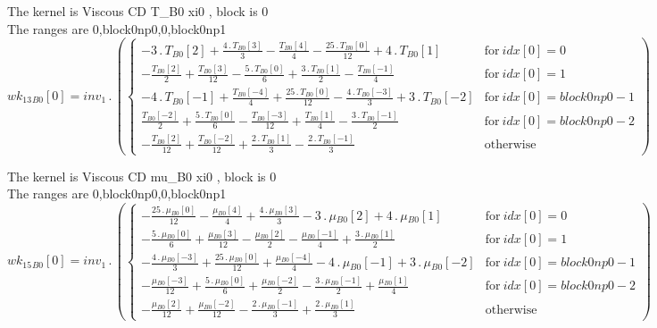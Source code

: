 \documentclass{article}
\begin{document}
\noindent The kernel is Viscous CD T_B0 xi0 , block is 0\\\noindent The ranges are 0,block0np0,0,block0np1\\\begin{dmath}{wk_{13}{_{B0}}}[{0}] = inv_1 \,.\, \left(\begin{cases} - 3 \,.\, {T{_{B0}}}[{2}] + \frac{4 \,.\, {T{_{B0}}}[{3}]}{3} - \frac{{T{_{B0}}}[{4}]}{4} - \frac{25 \,.\, {T{_{B0}}}[{0}]}{12} + 4 \,.\, {T{_{B0}}}[{1}] & \text{for}\: {idx}[{0}] = 
0 \\- \frac{{T{_{B0}}}[{2}]}{2} + \frac{{T{_{B0}}}[{3}]}{12} - \frac{5 \,.\, {T{_{B0}}}[{0}]}{6} + \frac{3 \,.\, {T{_{B0}}}[{1}]}{2} - \frac{{T{_{B0}}}[{-1}]}{4} & \text{for}\: {idx}[{0}] = 1 \\- 4 \,.\, {T{_{B0}}}[{-1}] + \frac{{T{_{B0}}}[{-4}]}{4} 
+ \frac{25 \,.\, {T{_{B0}}}[{0}]}{12} - \frac{4 \,.\, {T{_{B0}}}[{-3}]}{3} + 3 \,.\, {T{_{B0}}}[{-2}] & \text{for}\: {idx}[{0}] = block0np0 - 1 \\\frac{{T{_{B0}}}[{-2}]}{2} + \frac{5 \,.\, {T{_{B0}}}[{0}]}{6} - \frac{{T{_{B0}}}[{-3}]}{12} + 
\frac{{T{_{B0}}}[{1}]}{4} - \frac{3 \,.\, {T{_{B0}}}[{-1}]}{2} & \text{for}\: {idx}[{0}] = block0np0 - 2 \\- \frac{{T{_{B0}}}[{2}]}{12} + \frac{{T{_{B0}}}[{-2}]}{12} + \frac{2 \,.\, {T{_{B0}}}[{1}]}{3} - \frac{2 \,.\, {T{_{B0}}}[{-1}]}{3} & 
\text{otherwise} \end{cases}\right)\end{dmath}

\noindent The kernel is Viscous CD mu_B0 xi0 , block is 0\\\noindent The ranges are 0,block0np0,0,block0np1\\\begin{dmath}{wk_{15}{_{B0}}}[{0}] = inv_1 \,.\, \left(\begin{cases} - \frac{25 \,.\, {\mu{_{B0}}}[{0}]}{12} - \frac{{\mu{_{B0}}}[{4}]}{4} + \frac{4 \,.\, {\mu{_{B0}}}[{3}]}{3} - 3 \,.\, {\mu{_{B0}}}[{2}] + 4 \,.\, {\mu{_{B0}}}[{1}] & \text{for}\: 
{idx}[{0}] = 0 \\- \frac{5 \,.\, {\mu{_{B0}}}[{0}]}{6} + \frac{{\mu{_{B0}}}[{3}]}{12} - \frac{{\mu{_{B0}}}[{2}]}{2} - \frac{{\mu{_{B0}}}[{-1}]}{4} + \frac{3 \,.\, {\mu{_{B0}}}[{1}]}{2} & \text{for}\: {idx}[{0}] = 1 \\- \frac{4 \,.\, 
{\mu{_{B0}}}[{-3}]}{3} + \frac{25 \,.\, {\mu{_{B0}}}[{0}]}{12} + \frac{{\mu{_{B0}}}[{-4}]}{4} - 4 \,.\, {\mu{_{B0}}}[{-1}] + 3 \,.\, {\mu{_{B0}}}[{-2}] & \text{for}\: {idx}[{0}] = block0np0 - 1 \\- \frac{{\mu{_{B0}}}[{-3}]}{12} + \frac{5 \,.\, 
{\mu{_{B0}}}[{0}]}{6} + \frac{{\mu{_{B0}}}[{-2}]}{2} - \frac{3 \,.\, {\mu{_{B0}}}[{-1}]}{2} + \frac{{\mu{_{B0}}}[{1}]}{4} & \text{for}\: {idx}[{0}] = block0np0 - 2 \\- \frac{{\mu{_{B0}}}[{2}]}{12} + \frac{{\mu{_{B0}}}[{-2}]}{12} - \frac{2 \,.\, 
{\mu{_{B0}}}[{-1}]}{3} + \frac{2 \,.\, {\mu{_{B0}}}[{1}]}{3} & \text{otherwise} \end{cases}\right)\end{dmath}
\end{document}
